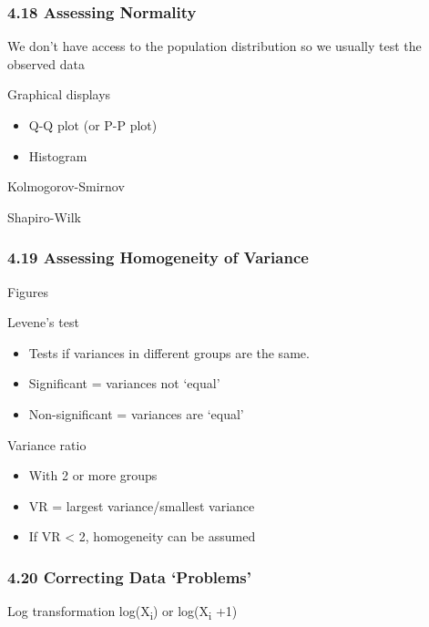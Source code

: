 \documentclass[]{article}
\providecommand{\tightlist}{%
  \setlength{\itemsep}{0pt}\setlength{\parskip}{0pt}}
\begin{document}
\hypertarget{assessing-normality}{%
\subsubsection{4.18 Assessing Normality}\label{assessing-normality}}

We don't have access to the population distribution so we usually test
the observed data

Graphical displays

\begin{itemize}
\tightlist
\item
  Q-Q plot (or P-P plot)
\item
  Histogram
\end{itemize}

Kolmogorov-Smirnov

Shapiro-Wilk

\hypertarget{assessing-homogeneity-of-variance}{%
\subsubsection{4.19 Assessing Homogeneity of
Variance}\label{assessing-homogeneity-of-variance}}

Figures

Levene's test

\begin{itemize}
\tightlist
\item
  Tests if variances in different groups are the same.
\item
  Significant = variances not `equal'
\item
  Non-significant = variances are `equal'
\end{itemize}

Variance ratio

\begin{itemize}
\tightlist
\item
  With 2 or more groups
\item
  VR = largest variance/smallest variance
\item
  If VR \textless{} 2, homogeneity can be assumed
\end{itemize}

\hypertarget{correcting-data-problems}{%
\subsubsection{4.20 Correcting Data
`Problems'}\label{correcting-data-problems}}

Log transformation log(X\textsubscript{i}) or log(X\textsubscript{i} +1)
\end{document}
